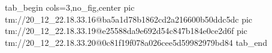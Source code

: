  
 
 
 
 

\qqSecOrig


\ifcmt
  tab_begin cols=3,no_fig,center
    pic tm://20_12_22.18.33.16@ba5a1d78b1862cd2a216600b50ddc5dc
    pic tm://20_12_22.18.33.19@e25588da9e692d54c847b184e0ce2d6f
    pic tm://20_12_22.18.33.20@0c81f19f078a026cee5d59982979bd84
  tab_end
\fi

